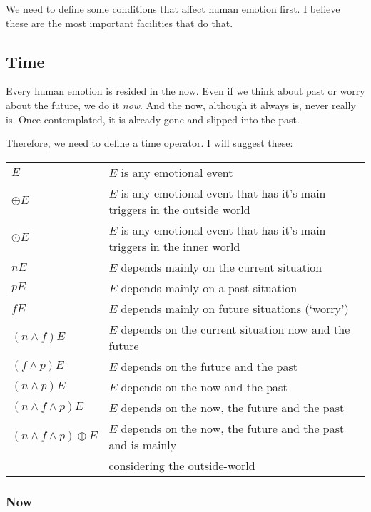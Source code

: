 \documentclass{scrartcl}
\begin{document}
We need to define some conditions that affect human emotion first. I believe these are the most important facilities that
do that.

\subsection{Time}

Every human emotion is resided in the now. Even if we think about past or worry about the future, we do it \textit{now}.
And the now, although it always is, never really is. Once contemplated, it is already gone and slipped into the past.

Therefore, we need to define a time operator. I will suggest these:

\begin{tabular}{l|l}
	$E$           & $E$ is any emotional event \\
	$\oplus E$           & $E$ is any emotional event that has it's main triggers in the outside world\footnotemark\\
	$\odot E$           & $E$ is any emotional event that has it's main triggers in the inner world\footnotemark\\
	$n E$ & $E$ depends mainly on the current situation \\
	$p E$ & $E$ depends mainly on a past situation \\
	$f E$ & $E$ depends mainly on future situations (`worry') \\
	$(n \wedge f) E$ & $E$ depends on the current situation now and the future \\
	$(f \wedge p) E$ & $E$ depends on the future and the past \\
	$(n \wedge p) E$ & $E$ depends on the now and the past \\
	$(n \wedge f \wedge p) E$ & $E$ depends on the now, the future and the past \\
	$(n \wedge f \wedge p) \oplus E$ & $E$ depends on the now, the future and the past and is mainly \\
					 &	considering the outside-world
\end{tabular}


\subsubsection{Now}
\end{document}
